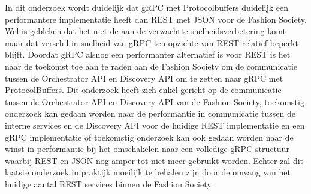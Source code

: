 In dit onderzoek wordt duidelijk dat gRPC met Protocolbuffers duidelijk een performantere implementatie heeft dan REST met JSON voor de Fashion Society. Wel is gebleken dat het niet de aan de verwachtte snelheidsverbetering komt maar dat verschil in snelheid van gRPC ten opzichte van REST relatief beperkt blijft. Doordat gRPC alsnog een performanter alternatief is voor REST is het naar de toekomst toe aan te raden aan de Fashion Society om de communicatie tussen de Orchestrator API en Discovery API om te zetten naar gRPC met ProtocolBuffers.
 Dit onderzoek heeft zich enkel gericht op de communicatie tussen de Orchestrator API en Discovery API van de Fashion Society, toekomstig onderzoek kan gedaan worden naar de performantie in communicatie tussen de interne services en de Discovery API voor de huidige REST implementatie en een gRPC implementatie of toekomstig onderzoek kan ook gedaan worden naar de winst in performantie bij het omschakelen naar een volledige gRPC structuur waarbij REST en JSON nog amper tot niet meer gebruikt worden. Echter zal dit laatste onderzoek in praktijk moeilijk te behalen zijn door de omvang van het huidige aantal REST services binnen de Fashion Society.
